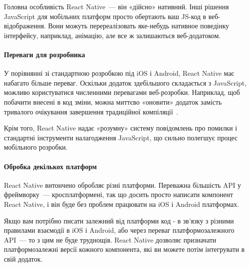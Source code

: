 Головна особливість React Native~--- він «дійсно» нативний. Інші рішення JavaScript для мобільних платформ просто обертають ваш JS-код в веб-відображення. Вони можуть перереалізовать яке-небудь нативное поведінку інтерфейсу, наприклад, анімацію, але все ж  залишаються веб-додатоком.

\paragraph{Переваги для розробника}

У порівнянні зі стандартною розробкою під iOS і Android, React Native має набагато більше переваг. Оскільки додаток здебільшого складається з JavaScript, можливо користуватися численними перевагами веб-розробки. Наприклад, щоб побачити внесені в код зміни, можна миттєво «оновити» додаток замість тривалого очікування завершення традиційної компіляції~\cite{robinwieruch2018}. 

Крім того, React Native надає «розумну» систему повідомлень про помилки і стандартні інструменти налагодження JavaScript, що сильно полегшує процес мобільного розробки.

\paragraph{Обробка декількох платформ}

React Native витончено обробляє різні платформи. Переважна більшість API у фреймворку~--- кросплатформені, так що досить просто написати компонент React Native, і він буде без проблем працювати на iOS і Android платформах.

Якщо вам потрібно писати залежний від платформи код - в зв'язку з різними правилами взаємодії в iOS і Android, або через переваг платформозалежного API~--- то з цим не буде труднощів. React Native дозволяє призначати платформозалежні версії кожного компонента, які ви можете потім інтегрувати в свій додаток.
